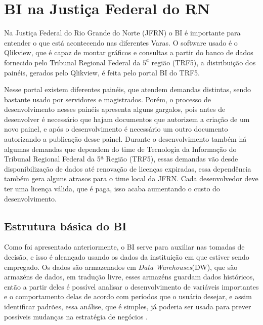 \chapter{BI na Justiça Federal do RN}\label{cap_trabalho_academico}


Na Justiça Federal do Rio Grande do Norte (JFRN) o BI é importante para entender o que está acontecendo nas diferentes Varas. O software usado é o Qlikview, que é capaz de montar gráficos e consultas a partir do banco de dados fornecido pelo Tribunal Regional Federal da $5^{a}$ região (TRF5), a distribuição dos painéis, gerados pelo Qlikview, é feita pelo portal BI do TRF5.

Nesse portal existem diferentes painéis, que atendem demandas distintas, sendo bastante usado por servidores e magistrados. Porém, o processo de desenvolvimento nesses painéis apresenta alguns gargalos, pois antes de desenvolver é necessário que hajam documentos que autorizem a criação de um novo painel, e após o desenvolvimento é necessário um outro documento autorizando a publicação desse painel. Durante o desenvolvimento também há algumas demandas que dependem do time de Tecnologia da Informação do Tribunal Regional Federal da 5ª Região (TRF5), essas demandas vão desde disponibilização de dados até renovação de licenças expiradas, essa dependência também gera alguns atrasos para o time local da JFRN. Cada desenvolvedor deve ter uma licença válida, que é paga, isso acaba aumentando o custo do desenvolvimento. 


\section{Estrutura básica do BI}

Como foi apresentado anteriormente, o BI serve para auxiliar nas tomadas de decisão, e isso é alcançado usando os dados da instituição em que estiver sendo empregado. Os dados são armazenados em \textit{Data Warehouses}(DW), que são armazéns de dados, em tradução livre, esses armazéns guardam dados históricos, então a partir deles é possível analisar o desenvolvimento de variáveis importantes e o comportamento delas de acordo com períodos que o usuário desejar, e assim identificar padrões, essa análise, que é simples, já poderia ser usada para prever possíveis mudanças na estratégia de negócios \cite{negash1}.

